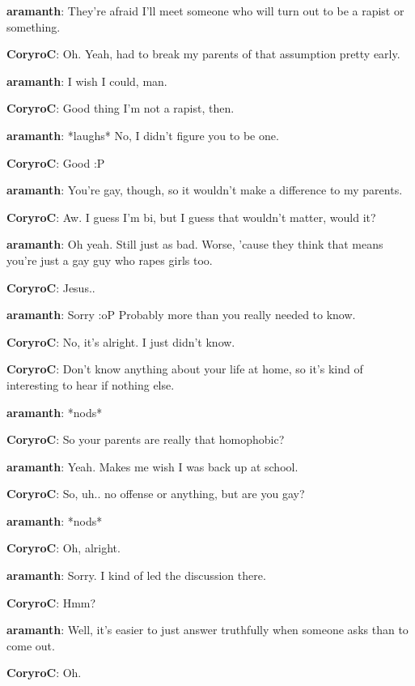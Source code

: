 \textbf{\color{red}aramanth}: They're afraid I'll meet someone who will turn out to be a rapist or something.

\textbf{\color{blue}CoryroC}: Oh.  Yeah, had to break my parents of that assumption pretty early.

\textbf{\color{red}aramanth}: I wish I could, man.

\textbf{\color{blue}CoryroC}: Good thing I'm not a rapist, then.

\textbf{\color{red}aramanth}: *laughs* No, I didn't figure you to be one.

\textbf{\color{blue}CoryroC}: Good :P

\textbf{\color{red}aramanth}: You're gay, though, so it wouldn't make a difference to my parents.

\textbf{\color{blue}CoryroC}: Aw.  I guess I'm bi, but I guess that wouldn't matter, would it?

\textbf{\color{red}aramanth}: Oh yeah.  Still just as bad.  Worse, 'cause they think that means you're just a gay guy who rapes girls too.

\textbf{\color{blue}CoryroC}: Jesus..

\textbf{\color{red}aramanth}: Sorry :oP  Probably more than you really needed to know.

\textbf{\color{blue}CoryroC}: No, it's alright.  I just didn't know.

\textbf{\color{blue}CoryroC}: Don't know anything about your life at home, so it's kind of interesting to hear if nothing else.

\textbf{\color{red}aramanth}: *nods*

\textbf{\color{blue}CoryroC}: So your parents are really that homophobic?

\textbf{\color{red}aramanth}: Yeah.  Makes me wish I was back up at school.

\textbf{\color{blue}CoryroC}: So, uh.. no offense or anything, but are you gay?

\textbf{\color{red}aramanth}: *nods*

\textbf{\color{blue}CoryroC}: Oh, alright.

\textbf{\color{red}aramanth}: Sorry.  I kind of led the discussion there.

\textbf{\color{blue}CoryroC}: Hmm?

\textbf{\color{red}aramanth}: Well, it's easier to just answer truthfully when someone asks than to come out.

\textbf{\color{blue}CoryroC}: Oh.

